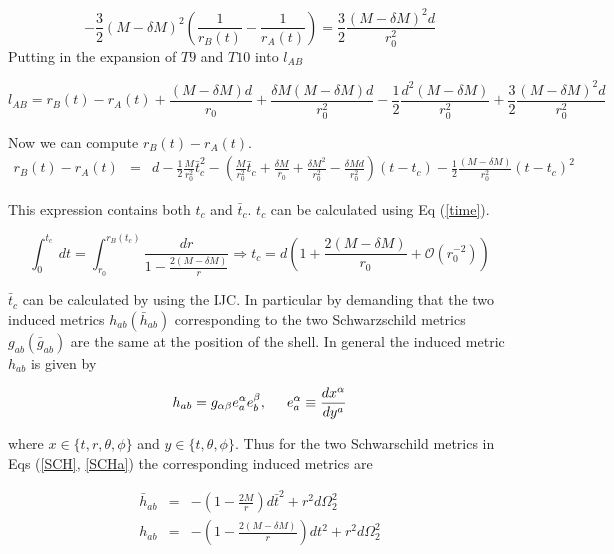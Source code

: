 \documentclass[aps,showpacs,onecolumn,floats,prd,superscriptaddress,nofootinbib]{revtex4-1}
\begin{document}
\begin{equation}
	- \frac{3}{2} (M - \delta M)^2 \left( \frac{1}{r_B(t)} - \frac{1}{r_A(t)} \right) = \frac{3}{2} \frac{(M -\delta M)^2d}{r_0^2}	\label{rsecond}
\end{equation}
Putting in the expansion of $T9$ and $T10$ into $l_{AB}$

\begin{equation}
	l_{AB} = r_B(t) - r_A(t) + \frac{(M - \delta M)d}{r_0} + \frac{\delta M (M - \delta M)d}{r_0^2} - \frac{1}{2} \frac{d^2(M- \delta M)}{r_0^2} + \frac{3}{2} \frac{(M - \delta M)^2d }{r_0^2}	\label{L1}
\end{equation}	

Now we can compute $r_B(t) - r_A(t)$. 
\begin{eqnarray}
	r_B(t) - r_A(t) & = & d - \frac{1}{2} \frac{M}{r_0^2} \bar{t}_c^2 - \left( \frac{M}{r_0^2} \bar{t}_c + \frac{\delta M}{r_0} + \frac{\delta M^2}{r_0^2} - \frac{\delta M d}{r_0^2} \right) (t - t_c) - \frac{1}{2} \frac{(M - \delta M)}{r_0^2} (t - t_c)^2 \label{rchange}
\end{eqnarray}


This expression contains both $t_c$ and $\bar{t}_c$. $t_c$ can be calculated using Eq (\ref{time}).

\begin{equation}
	\int^{t_c}_0 \ dt = \int^{r_B(t_c)}_{r_0} \frac{dr}{1 - \frac{2(M - \delta M)}{r}} \Rightarrow t_c = d \left( 1 + \frac{2(M - \delta M)}{r_0} + \mathcal{O}(r_0^{-2}) \right)	\label{tc}
\end{equation}

$\bar{t}_c$ can be calculated by using the IJC. In particular by demanding that the two induced metrics $h_{ab}(\bar{h}_{ab})$ corresponding to the two Schwarzschild metrics $g_{ab}(\bar{g}_{ab})$ are the same at the position of the shell. In general the induced metric $h_{ab}$ is given by

\begin{equation}
	h_{ab} = g_{\alpha \beta} e^\alpha_a e^\beta_b, \hspace{5mm} e^\alpha_a \equiv \frac{dx^\alpha}{dy^a}
\end{equation}

where $x \in \{t,r,\theta,\phi\}$ and $y\in \{t,\theta, \phi\}$. Thus for the two Schwarschild metrics in Eqs (\ref{SCH}, \ref{SCHa}) the corresponding induced metrics are

\begin{eqnarray}
	\bar{h}_{ab} & = & -\left( 1 - \frac{2M}{r} \right) d\bar{t}^2 + r^2 d \Omega_2^2	\nonumber	\\
	h_{ab} & = & -\left( 1 - \frac{2(M - \delta M)}{r} \right) dt^2 + r^2 d \Omega_2^2
\end{eqnarray}
\end{document}
